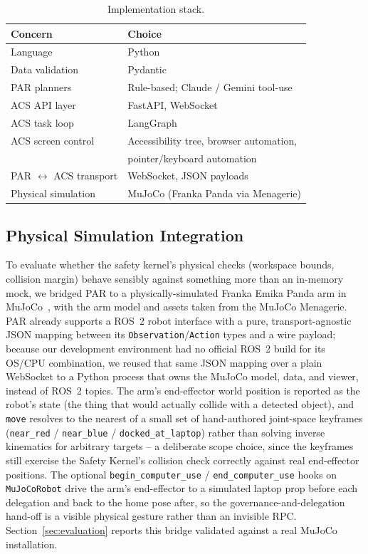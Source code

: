 \documentclass{article}
\begin{document}
\begin{table}[t]
\centering
\caption{Implementation stack.}
\label{tab:stack}
\begin{tabular}{@{}ll@{}}
\toprule
Concern & Choice \\
\midrule
Language & Python \\
Data validation & Pydantic \\
PAR planners & Rule-based; Claude / Gemini tool-use \\
ACS API layer & FastAPI, WebSocket \\
ACS task loop & LangGraph \\
ACS screen control & Accessibility tree, browser automation, \\
 & pointer/keyboard automation \\
PAR $\leftrightarrow$ ACS transport & WebSocket, JSON payloads \\
Physical simulation & MuJoCo (Franka Panda via Menagerie) \\
\bottomrule
\end{tabular}
\end{table}

\subsection{Physical Simulation Integration}
\label{sec:mujoco-integration}
To evaluate whether the safety kernel's physical checks (workspace bounds, collision margin) behave sensibly against something more than an in-memory mock, we bridged PAR to a physically-simulated Franka Emika Panda arm in MuJoCo~\citep{todorov2012mujoco}, with the arm model and assets taken from the MuJoCo Menagerie. PAR already supports a ROS~2 robot interface with a pure, transport-agnostic JSON mapping between its \texttt{Observation}/\texttt{Action} types and a wire payload; because our development environment had no official ROS~2 build for its OS/CPU combination, we reused that same JSON mapping over a plain WebSocket to a Python process that owns the MuJoCo model, data, and viewer, instead of ROS~2 topics. The arm's end-effector world position is reported as the robot's state (the thing that would actually collide with a detected object), and \texttt{move} resolves to the nearest of a small set of hand-authored joint-space keyframes (\texttt{near\_red} / \texttt{near\_blue} / \texttt{docked\_at\_laptop}) rather than solving inverse kinematics for arbitrary targets -- a deliberate scope choice, since the keyframes still exercise the Safety Kernel's collision check correctly against real end-effector positions. The optional \texttt{begin\_computer\_use} / \texttt{end\_computer\_use} hooks on \texttt{MuJoCoRobot} drive the arm's end-effector to a simulated laptop prop before each delegation and back to the home pose after, so the governance-and-delegation hand-off is a visible physical gesture rather than an invisible RPC. Section~\ref{sec:evaluation} reports this bridge validated against a real MuJoCo installation.
\end{document}
